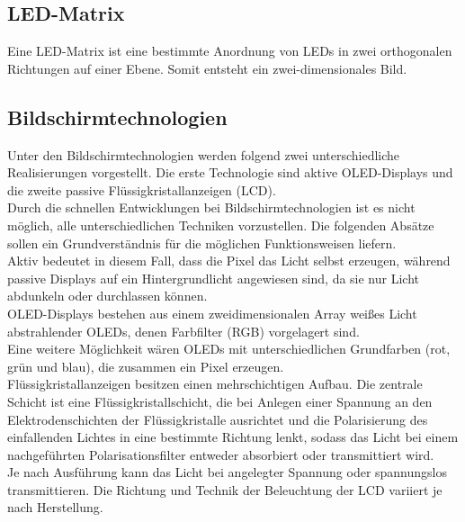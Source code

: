 \subsection{LED-Matrix}
Eine LED-Matrix ist eine bestimmte Anordnung von LEDs in zwei orthogonalen Richtungen auf einer Ebene. Somit entsteht ein zwei-dimensionales Bild. 
\subsection{Bildschirmtechnologien}
Unter den Bildschirmtechnologien werden folgend zwei unterschiedliche Realisierungen vorgestellt. Die erste Technologie sind aktive OLED-Displays und die zweite passive Flüssigkristallanzeigen (LCD). \\
Durch die schnellen Entwicklungen bei Bildschirmtechnologien ist es nicht möglich, alle unterschiedlichen Techniken vorzustellen. Die folgenden Absätze sollen ein Grundverständnis für die möglichen Funktionsweisen liefern.\\
Aktiv bedeutet in diesem Fall, dass die Pixel das Licht selbst erzeugen, während passive Displays auf ein Hintergrundlicht angewiesen sind, da sie nur Licht abdunkeln oder durchlassen können. \\
\glqq OLED-Displays bestehen aus einem zweidimensionalen Array weißes Licht abstrahlender OLEDs, denen Farbfilter (RGB) vorgelagert sind.\grqq \cite[Seite 347]{LofflerMang.2020} \\
Eine weitere Möglichkeit wären OLEDs mit unterschiedlichen Grundfarben (rot, grün und blau), die zusammen ein Pixel erzeugen. \\
Flüssigkristallanzeigen besitzen einen mehrschichtigen Aufbau. Die zentrale Schicht ist eine Flüssigkristallschicht, die bei Anlegen einer Spannung an den Elektrodenschichten der Flüssigkristalle ausrichtet und die Polarisierung des einfallenden Lichtes in eine bestimmte Richtung lenkt, sodass das Licht bei einem nachgeführten Polarisationsfilter entweder absorbiert oder transmittiert wird. \cite[][Vgl. Seite 346 f.]{LofflerMang.2020} \\
Je nach Ausführung kann das Licht bei angelegter Spannung oder spannungslos transmittieren. Die Richtung und Technik der Beleuchtung der LCD variiert je nach Herstellung.
